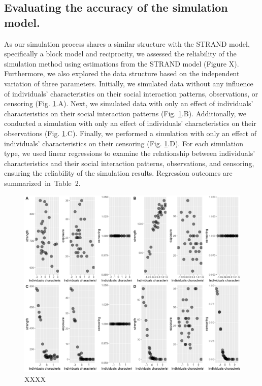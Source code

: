\documentclass[Afour,sageh,times]{sagej}
\begin{document}
\subsection{Evaluating the accuracy of the simulation model.}
As our simulation process shares a similar structure with the STRAND model, specifically a block model and reciprocity, we assessed the reliability of the simulation method using estimations from the STRAND model (Figure X). Furthermore, we also explored the data structure based on the independent variation of three parameters. Initially, we simulated data without any influence of individuals' characteristics on their social interaction patterns, observations, or censoring (Fig. \ref{figSimTest}.A). Next, we simulated data with only an effect of individuals' characteristics on their social interaction patterns (Fig. \ref{figSimTest}.B). Additionally, we conducted a simulation with only an effect of individuals' characteristics on their observations (Fig. \ref{figSimTest}.C). Finally, we performed a simulation with only an effect of individuals' characteristics on their censoring (Fig. \ref{figSimTest}.D). For each simulation type, we used linear regressions to examine the relationship between individuals' characteristics and their social interaction patterns, observations, and censoring, ensuring the reliability of the simulation results. Regression outcomes are summarized in Table 2.



\begin{figure}[t]
  \caption{XXXX}\label{figSimTest}
  \centering
  \includegraphics[trim={0 0 0 0cm},clip,width=1\textwidth]{Figures/Appendix2/Figure3.png}
\end{figure}
\end{document}
